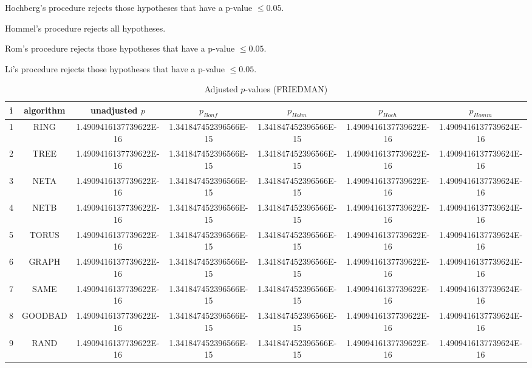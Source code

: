 \documentclass[a4paper,10pt]{article}
\begin{document}
\begin{landscape}
Hochberg's procedure rejects those hypotheses that have a p-value $\le0.05$.


Hommel's procedure rejects all hypotheses.


Rom's procedure rejects those hypotheses that have a p-value $\le0.05$.


Li's procedure rejects those hypotheses that have a p-value $\le0.05$.



\newpage

\begin{table}[!htp]
\centering\scriptsize
\caption{Adjusted $p$-values (FRIEDMAN)}
\begin{tabular}{ccccccc}
i&algorithm&unadjusted $p$&$p_{Bonf}$&$p_{Holm}$&$p_{Hoch}$&$p_{Homm}$\\
\hline
1& RING&1.4909416137739622E-16&1.341847452396566E-15&1.341847452396566E-15&1.4909416137739622E-16&1.4909416137739624E-16\\
2& TREE&1.4909416137739622E-16&1.341847452396566E-15&1.341847452396566E-15&1.4909416137739622E-16&1.4909416137739624E-16\\
3& NETA&1.4909416137739622E-16&1.341847452396566E-15&1.341847452396566E-15&1.4909416137739622E-16&1.4909416137739624E-16\\
4& NETB&1.4909416137739622E-16&1.341847452396566E-15&1.341847452396566E-15&1.4909416137739622E-16&1.4909416137739624E-16\\
5& TORUS&1.4909416137739622E-16&1.341847452396566E-15&1.341847452396566E-15&1.4909416137739622E-16&1.4909416137739624E-16\\
6& GRAPH&1.4909416137739622E-16&1.341847452396566E-15&1.341847452396566E-15&1.4909416137739622E-16&1.4909416137739624E-16\\
7& SAME&1.4909416137739622E-16&1.341847452396566E-15&1.341847452396566E-15&1.4909416137739622E-16&1.4909416137739624E-16\\
8& GOODBAD&1.4909416137739622E-16&1.341847452396566E-15&1.341847452396566E-15&1.4909416137739622E-16&1.4909416137739624E-16\\
9& RAND&1.4909416137739622E-16&1.341847452396566E-15&1.341847452396566E-15&1.4909416137739622E-16&1.4909416137739624E-16\\
\hline
\end{tabular}
\end{table}


\end{landscape}
\end{document}
